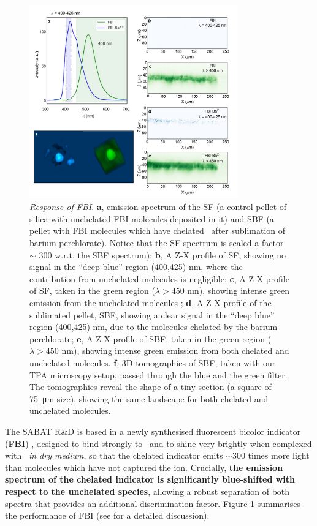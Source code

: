 \documentclass[a4paper,11pt]{article}
\begin{document}
\begin{figure}[htb!]
\centering
\includegraphics[width=0.8\textwidth]{figura2d.png}
\vspace*{-8mm}
\caption{{\it Response of FBI}. {\bf a}, emission spectrum of the SF (a control pellet of silica with unchelated FBI molecules deposited in it) and SBF (a pellet with FBI molecules which have chelated \Bapp\ after sublimation of barium perchlorate). Notice that the SF spectrum is scaled a factor $\sim$ 300 w.r.t. the SBF spectrum); {\bf b}, A Z-X profile of SF, showing no signal in the ``deep blue'' region (400,425) nm, where the contribution from unchelated molecules is negligible;  {\bf c}, A Z-X profile of SF, taken in the green region ($\lambda > 450$ nm), showing intense green emission from the unchelated molecules 
; {\bf d}, A Z-X profile of the sublimated pellet, SBF, showing a clear signal in the ``deep blue'' region (400,425) nm, due to the molecules chelated by the barium perchlorate;  {\bf e}, A Z-X profile of SBF, taken in the green region ($\lambda > 450$ nm), showing intense green emission from both chelated and unchelated molecules. {\bf f}, 3D tomographies of SBF, taken with our TPA microscopy setup, passed through the blue and the green filter. The tomographies reveal the shape of a tiny section (a square of \SI{75}{\micro\meter} size), showing the same landscape for both chelated and unchelated molecules.}
\label{fig:fbi}
\end{figure}

The SABAT R\&D is based in a newly synthesised 
fluorescent bicolor indicator (\textbf{FBI}) \cite{Rivilla:2019vzd, Rivilla:2020cvm}, designed to bind strongly to \Bapp\ and to shine very brightly when complexed with \Bapp\ {\it in dry medium}, so that the chelated indicator emits $\sim$300 times more light than molecules which have not captured the ion. Crucially, {\bf the emission spectrum of the chelated indicator is significantly blue-shifted  with respect to the unchelated species}, allowing a robust separation of both spectra that provides an additional discrimination factor. Figure \ref{fig:fbi} summarises the performance of FBI (see \cite{Rivilla:2019vzd, Rivilla:2020cvm} for a detailed discussion). 
\end{document}
